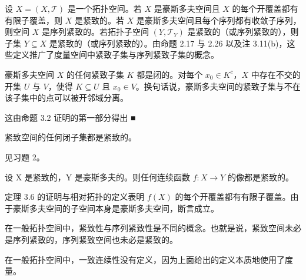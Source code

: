 \begin{remark}

\begin{items}
\item

设 $ X = (X, \mathcal{T}) $ 是一个拓扑空间。若 $ X $ 是豪斯多夫空间且 $ X $ 的每个开覆盖都有有限子覆盖，则 $ X $ 是紧致的。若 $ X $ 是豪斯多夫空间且每个序列都有收敛子序列，则空间 $ X $ 是序列紧致的。若拓扑子空间 $ (Y, \mathcal{T}_Y) $ 是紧致的（或序列紧致的），则子集 $ Y \subseteq X $ 是紧致的（或序列紧致的）。由命题 2.17 与 2.26 以及注 3.11(b)，这些定义推广了度量空间中紧致子集与序列紧致子集的概念。

\item

豪斯多夫空间 $ X $ 的任何紧致子集 $ K $ 都是闭的。对每个 $ x_0 \in K^c $，$ X $ 中存在不交的开集 $ U $ 与 $ V $，使得 $ K \subseteq U $ 且 $ x_0 \in V $。换句话说，豪斯多夫空间的紧致子集与不在该子集中的点可以被开邻域分离。

\proofhead
这由命题 3.2 证明的第一部分得出 ■
\item

紧致空间的任何闭子集都是紧致的。

\proofhead
见习题 2。
\item

设 X 是紧致的，Y 是豪斯多夫的。则任何连续函数 $ f: X \to Y $ 的像都是紧致的。

\proofhead
定理 3.6 的证明与相对拓扑的定义表明 $ f(X) $ 的每个开覆盖都有有限子覆盖。由于豪斯多夫空间的子空间本身是豪斯多夫空间，断言成立。
\item

在一般拓扑空间中，紧致性与序列紧致性是不同的概念。也就是说，紧致空间未必是序列紧致的，序列紧致空间也未必是紧致的。

\item

在一般拓扑空间中，一致连续性没有定义，因为上面给出的定义本质地使用了度量。

\end{items}

\end{remark}

\exerciseshead

